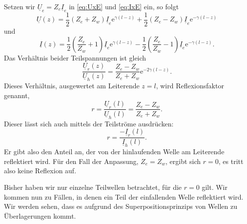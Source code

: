 \documentclass[paper=a4, parskip=half-, ngerman, fontsize=11pt]{scrreprt}
\begin{document}
Setzen wir $\underline{U}_{e} = Z_{e} \underline{I}_{e}$ in \eqref{eq:UxE} und \eqref{eq:IxE} ein, so folgt
\[
\underline{U}(z) = \frac{1}{2} \left( Z_{e} + Z_{w} \right) \underline{I}_{e} \mathrm{e}^{\gamma (l - z)}
+
\frac{1}{2} \left( Z_{e} - Z_{w} \right) \underline{I}_{e} \mathrm{e}^{- \gamma (l - z)}
\]
und
\[
\underline{I}(z) = \frac{1}{2} \left( \frac{Z_{e}}{Z_{w}} + 1 \right) \underline{I}_{e} \mathrm{e}^{\gamma (l - z)}
-
\frac{1}{2} \left( \frac{Z_{e}}{Z_{w}} - 1 \right) \underline{I}_{e} \mathrm{e}^{- \gamma (l - z)} .
\]
Das Verhältnis beider Teilspannungen ist gleich
\[
\frac{\underline{U}_{r}(z)}{\underline{U}_{h}(z)} = \frac{Z_{e}-Z_{w}}{Z_{e}+Z_{w}} \mathrm{e}^{-2 \gamma (l-z)}.
\]
Dieses Verhältnis, ausgewertet am Leiterende $z = l$, wird Reflexionsfaktor genannt,
\begin{equation}
r = \frac{\underline{U}_{r}(l)}{\underline{U}_{h}(l)} = \frac{Z_{e}-Z_{w}}{Z_{e}+Z_{w}} \label{eq:RFactor}.
\end{equation}
Dieser lässt sich auch mittels der Teilströme ausdrücken:
\begin{equation*}
    r = \frac{- \underline{I}_{r}(l)}{\underline{I}_{h}(l)}.
\end{equation*}
Er gibt also den Anteil an, der von der hinlaufenden Welle am Leiterende reflektiert wird. Für den Fall der Anpassung,
$Z_{e} = Z_{w}$, ergibt sich $r = 0$, es tritt also keine Reflexion auf.

Bisher haben wir nur einzelne Teilwellen betrachtet, für die $r = 0$ gilt. Wir kommen nun zu Fällen, in denen ein Teil
der einfallenden Welle reflektiert wird. Wir werden sehen, dass es aufgrund des Superpositionsprinzips von Wellen zu
Überlagerungen kommt.
\end{document}

